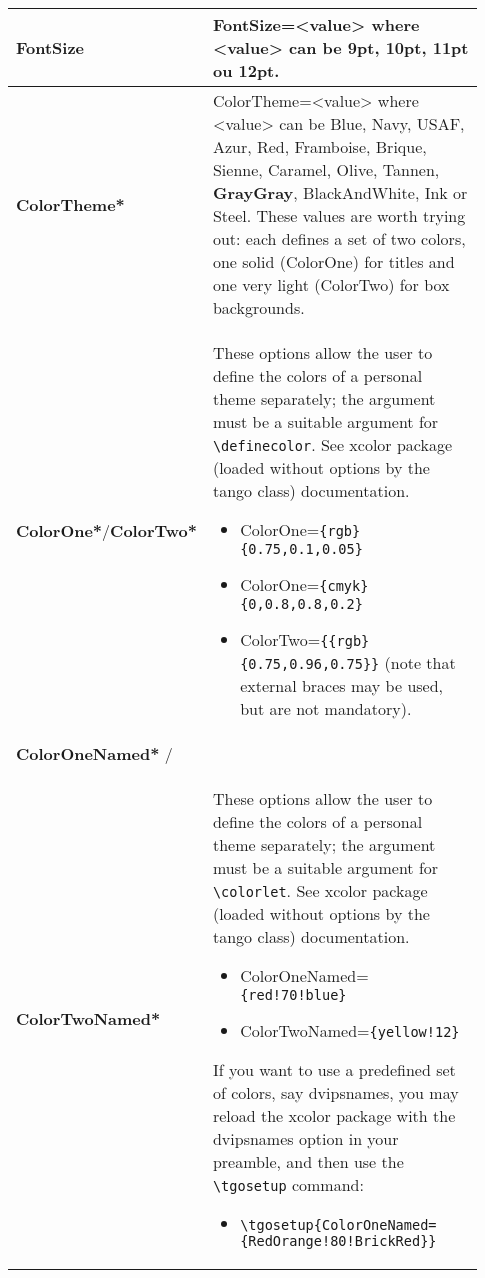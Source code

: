 \documentclass[english,ColorTheme=Red,FontSize=10pt]{tango}
\newcommand\DO[1]{\textcolor{ColorOne}{\bfseries #1}}
\newcommand\TO[1]{\textsf{#1}}
\begin{document}
\begin{longtable}{p{0.23\linewidth}p{0.7\linewidth}}
\hline
\TO{FontSize}&\TO{FontSize=<value>} where \TO{<value>} can be \TO{9pt}, \TO{\DO{10pt}}, \TO{11pt} ou \TO{12pt}.\\
\hline
\TO{\textbf{ColorTheme*}}&\TO{ColorTheme=<value>} where  \TO{<value>} can be \TO{Blue, Navy, USAF, Azur, Red, Framboise, Brique, Sienne, Caramel, Olive, Tannen, \DO{GrayGray}, BlackAndWhite, Ink} or \TO{Steel}. These values are worth trying out: each defines a set of two colors, one solid (ColorOne) for titles and one very light (ColorTwo) for box backgrounds.\\
\hline
\TO{\textbf{ColorOne*}/\textbf{ColorTwo*}}& These options allow the user to define the colors of a personal theme separately; the argument must be a suitable argument for \verb=\definecolor=. See xcolor package (loaded without options by the tango class) documentation. 
\begin{example}[Examples]
 \begin{itemize}
 \item\TO{ColorOne=}\verb={rgb}{0.75,0.1,0.05}=
  \item\TO{ColorOne=}\verb={cmyk}{0,0.8,0.8,0.2}=
 \item\TO{ColorTwo=}\verb={{rgb}{0.75,0.96,0.75}}= (note that external braces may be used, but are not mandatory).
\end{itemize} 
\end{example}
\\
\hline
\TO{\textbf{ColorOneNamed*}} / \\
\TO{\textbf{ColorTwoNamed*}}&
These options allow the user to define the colors of a personal theme separately; the argument must be a suitable argument for \verb=\colorlet=. See xcolor package (loaded without options by the tango class) documentation. 
\begin{example}[Examples]
 \begin{itemize}
 \item\TO{ColorOneNamed=}\verb={red!70!blue}=
\item\TO{ColorTwoNamed=}\verb={yellow!12}=
 \end{itemize} 
\end{example}
If you want to use a predefined set of colors, say \TO{dvipsnames}, you may reload the \TO{xcolor} package with the \TO{dvipsnames} option in your preamble, and then use the \verb=\tgosetup= command:
\begin{itemize}
\item \verb+\tgosetup{ColorOneNamed={RedOrange!80!BrickRed}}+
 \end{itemize} 

\end{longtable}
\end{document}
